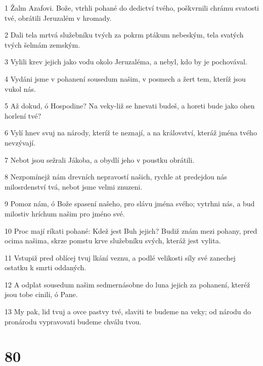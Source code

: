 \par 1 Žalm Azafovi. Bože, vtrhli pohané do dedictví tvého, poškvrnili chrámu svatosti tvé, obrátili Jeruzalém v hromady.
\par 2 Dali tela mrtvá služebníku tvých za pokrm ptákum nebeským, tela svatých tvých šelmám zemským.
\par 3 Vylili krev jejich jako vodu okolo Jeruzaléma, a nebyl, kdo by je pochovával.
\par 4 Vydáni jsme v pohanení sousedum našim, v posmech a žert tem, kteríž jsou vukol nás.
\par 5 Až dokud, ó Hospodine? Na veky-liž se hnevati budeš, a horeti bude jako ohen horlení tvé?
\par 6 Vylí hnev svuj na národy, kteríž te neznají, a na království, kteráž jména tvého nevzývají.
\par 7 Nebot jsou sežrali Jákoba, a obydlí jeho v poustku obrátili.
\par 8 Nezpomínejž nám drevních nepravostí našich, rychle at predejdou nás milosrdenství tvá, nebot jsme velmi znuzeni.
\par 9 Pomoz nám, ó Bože spasení našeho, pro slávu jména svého; vytrhni nás, a bud milostiv hríchum našim pro jméno své.
\par 10 Proc mají ríkati pohané: Kdež jest Buh jejich? Budiž znám mezi pohany, pred ocima našima, skrze pomstu krve služebníku svých, kteráž jest vylita.
\par 11 Vstupiž pred oblícej tvuj lkání veznu, a podlé velikosti síly své zanechej ostatku k smrti oddaných.
\par 12 A odplat sousedum našim sedmernásobne do luna jejich za pohanení, kteréž jsou tobe cinili, ó Pane.
\par 13 My pak, lid tvuj a ovce pastvy tvé, slaviti te budeme na veky; od národu do pronárodu vypravovati budeme chválu tvou.

\chapter{80}

